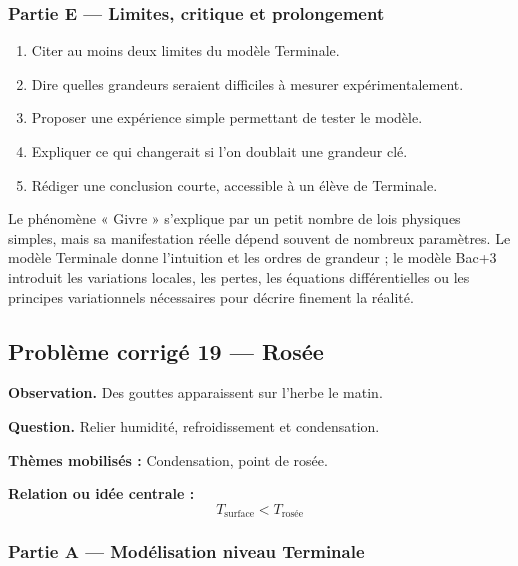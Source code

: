 \documentclass[11pt,a4paper]{article}
\begin{document}
\subsubsection*{Partie E — Limites, critique et prolongement}

\begin{enumerate}
  \item Citer au moins deux limites du modèle Terminale.
  \item Dire quelles grandeurs seraient difficiles à mesurer expérimentalement.
  \item Proposer une expérience simple permettant de tester le modèle.
  \item Expliquer ce qui changerait si l'on doublait une grandeur clé.
  \item Rédiger une conclusion courte, accessible à un élève de Terminale.
\end{enumerate}

\begin{corrigebox}
Le phénomène « Givre » s'explique par un petit nombre de lois physiques simples, mais sa manifestation réelle dépend souvent de nombreux paramètres. Le modèle Terminale donne l'intuition et les ordres de grandeur ; le modèle Bac+3 introduit les variations locales, les pertes, les équations différentielles ou les principes variationnels nécessaires pour décrire finement la réalité.
\end{corrigebox}

\subsection{Problème corrigé 19 — Rosée}

\begin{exercicebox}
\textbf{Observation.} Des gouttes apparaissent sur l'herbe le matin.

\medskip
\textbf{Question.} Relier humidité, refroidissement et condensation.

\medskip
\textbf{Thèmes mobilisés :} Condensation, point de rosée.

\medskip
\textbf{Relation ou idée centrale :}
\[
T_{\mathrm{surface}}<T_{\mathrm{rosée}}
\]
\end{exercicebox}

\subsubsection*{Partie A — Modélisation niveau Terminale}
\end{document}
